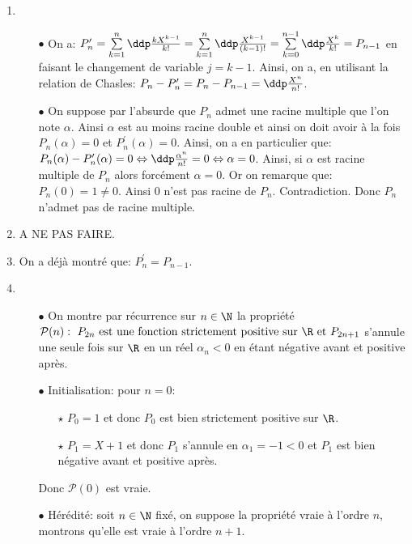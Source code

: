 \documentclass[a4paper, 11pt,reqno]{article}
\begin{document}
\begin{correction}
	\begin{enumerate}
		\item
		      \begin{itemize}
			      \item[$\bullet$] On a: $P_n^{\prime}=\sum\limits_{k=1}^n \ddp\frac{k X^{k-1}}{k!}=\sum\limits_{k=1}^n \ddp\frac{X^{k-1}}{(k-1)!}=\sum\limits_{k=0}^{n-1} \ddp\frac{ X^{k}}{k!}=P_{n-1}$ en faisant le changement de variable $j=k-1$. Ainsi, on a, en utilisant la relation de Chasles: $P_n-P_n^{\prime}=P_n-P_{n-1}=\ddp\frac{X^n}{n!}$.
			      \item[$\bullet$] On suppose par l'absurde que $P_n$ admet une racine multiple que l'on note $\alpha$. Ainsi $\alpha$ est au moins racine double et ainsi on doit avoir \`{a} la fois $P_n(\alpha)=0$ et $P_n^{\prime}(\alpha)=0$. Ainsi, on a en particulier que: $P_n(\alpha)-P_{n}^{\prime}(\alpha)=0\Leftrightarrow \ddp\frac{\alpha^n}{n!}=0\Leftrightarrow \alpha=0$. Ainsi, si $\alpha$ est racine multiple de $P_n$ alors forc\'ement $\alpha=0$. Or on remarque que: $P_n(0)=1\not= 0$. Ainsi $0$ n'est pas racine de $P_n$. Contradiction. Donc $P_n$ n'admet pas de racine multiple.
		      \end{itemize}
		\item A NE PAS FAIRE.
		\item On a d\'ej\`{a} montr\'e que: $P_n^{\prime}=P_{n-1}$.
		\item
		      \begin{itemize}
			      \item[$\bullet$] On montre par r\'ecurrence sur $n\in\N$ la propri\'et\'e $\mathcal{P}(n):\ P_{2n}\ \mathrm{est\ une\ fonction\ strictement\ positive\ sur}\ \R\ \mathrm{et}\ P_{2n+1}$ s'annule une seule fois sur $\R$ en un r\'eel $\alpha_n<0$ en \'etant n\'egative avant et positive apr\`{e}s.
			      \item[$\bullet$] Initialisation: pour $n=0$:
			            \begin{itemize}
				            \item[$\star$] $P_0=1$ et donc $P_0$ est bien strictement positive sur $\R$.
				            \item[$\star$] $P_1=X+1$ et donc $P_1$ s'annule en $\alpha_1=-1<0$ et $P_1$ est bien n\'egative avant et positive apr\`{e}s.
			            \end{itemize}
			            Donc $\mathcal{P}(0)$ est vraie.
			      \item[$\bullet$] H\'er\'edit\'e: soit $n\in\N$ fix\'e, on suppose la propri\'et\'e vraie \`{a} l'ordre $n$, montrons qu'elle est vraie \`{a} l'ordre $n+1$.

\end{itemize}
\end{enumerate}
\end{correction}
\end{document}
